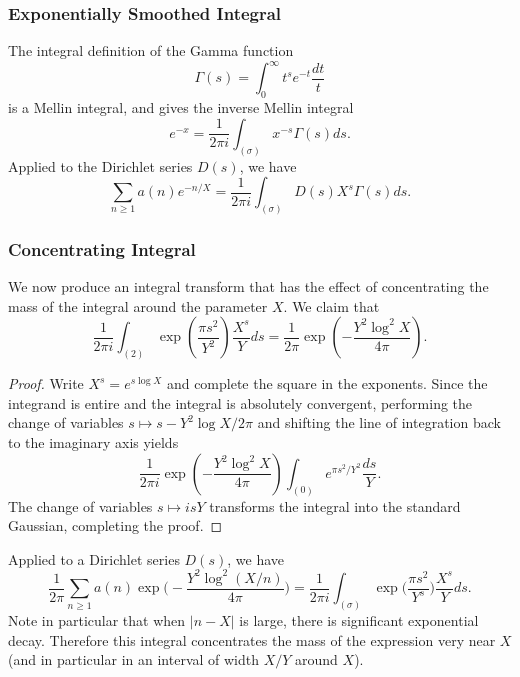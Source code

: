 \subsubsection*{Exponentially Smoothed Integral}

The integral definition of the Gamma function
\begin{equation}
  \Gamma(s) = \int_0^\infty t^s e^{-t} \frac{dt}{t}
\end{equation}
is a Mellin integral, and gives the inverse Mellin integral
\begin{equation}
  e^{-x} = \frac{1}{2 \pi i} \int_{(\sigma)} x^{-s} \Gamma(s) ds.
\end{equation}
Applied to the Dirichlet series $D(s)$, we have
\begin{equation}
  \sum_{n \geq 1} a(n) e^{-n/X} = \frac{1}{2\pi i} \int_{(\sigma)} D(s) X^s \Gamma(s) ds.
\end{equation}


\subsubsection*{Concentrating Integral}

We now produce an integral transform that has the effect of concentrating the mass of the
integral around the parameter $X$.
We claim that
\begin{equation}\label{eq:back:conc_I}
  \frac{1}{2\pi i} \int_{(2)} \exp\left(\frac{\pi s^2}{Y^2}\right) \frac{X^s}{Y}ds =
  \frac{1}{2\pi} \exp\left(-\frac{Y^2 \log^2 X}{4\pi}\right).
\end{equation}

\begin{proof}
  Write $X^s = e^{s\log X}$ and complete the square in the exponents.
  Since the integrand is entire and the integral is absolutely convergent, performing the
  change of variables $s \mapsto s-Y^2 \log X/2\pi$ and shifting the line of integration
  back to the imaginary axis yields
  \begin{equation*}
    \frac{1}{2\pi i} \exp\left( - \frac{Y^2 \log^2 X}{4\pi}\right) \int_{(0)} e^{\pi
    s^2/Y^2} \frac{ds}{Y}.
  \end{equation*}
  The change of variables $s \mapsto isY$ transforms the integral into the standard
  Gaussian, completing the proof.
\end{proof}


Applied to a Dirichlet series $D(s)$, we have
\begin{equation}
  \frac{1}{2\pi} \sum_{n \geq 1} a(n) \exp \bigg( - \frac{Y^2 \log^2 (X/n)}{4\pi} \bigg) =
  \frac{1}{2\pi i} \int_{(\sigma)} \exp \big( \frac{\pi s^2}{Y^s} \big) \frac{X^s}{Y} ds.
\end{equation}
Note in particular that when $\lvert n - X \rvert$ is large, there is significant
exponential decay.
Therefore this integral concentrates the mass of the expression very near $X$ (and in
particular in an interval of width $X/Y$ around $X$).



